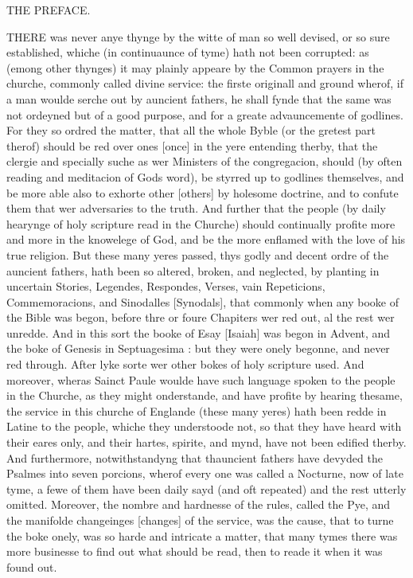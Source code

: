 THE
PREFACE.

THERE
was never anye thynge by the witte of man so well devised, or so sure
established, whiche (in continuaunce of tyme) hath not been corrupted:
as (emong other thynges) it may plainly appeare by the Common prayers
in the churche, commonly called divine service: the firste originall
and ground wherof, if a man woulde serche out by auncient fathers, he
shall fynde that the same was not ordeyned but of a good purpose, and
for a greate advauncemente of godlines. For they so ordred the matter,
that all the whole Byble (or the gretest part therof) should be red
over ones [once]
in the yere entending therby, that the clergie and specially suche as
wer Ministers of the congregacion, should (by often reading and meditacion
of Gods word), be styrred up to godlines themselves, and be more able
also to exhorte other [others]
by holesome doctrine, and to confute them that wer adversaries to the
truth. And further that the people (by daily hearynge of holy scripture
read in the Churche) should continually profite more and more in the
knowelege of God, and be the more enflamed with the love of his true
religion. But these many yeres passed, thys godly and decent ordre of
the auncient fathers, hath been so altered, broken, and neglected, by
planting in uncertain Stories, Legendes, Respondes, Verses, vain Repeticions,
Commemoracions, and Sinodalles [Synodals],
that commonly when any booke of the Bible was begon, before thre or
foure Chapiters wer red out, al the rest wer unredde. And in this sort
the booke of Esay [Isaiah]
was begon in Advent, and the boke of Genesis in Septuagesima : but they
were onely begonne, and never red through. After lyke sorte wer other
bokes of holy scripture used. And moreover, wheras Sainct Paule woulde
have such language spoken to the people in the Churche, as they might
onderstande, and have profite by hearing thesame, the service in this
churche of Englande (these many yeres) hath been redde in Latine to
the people, whiche they understoode not, so that they have heard with
their eares only, and their hartes, spirite, and mynd, have not been
edified therby. And furthermore, notwithstandyng that thauncient fathers
have devyded the Psalmes into seven porcions, wherof every one was called
a Nocturne, now of late tyme, a fewe of them have been daily sayd (and
oft repeated) and the rest utterly omitted. Moreover, the nombre and
hardnesse of the rules, called the Pye, and the manifolde changeinges
[changes]
of the service, was the cause, that to turne the boke onely, was so
harde and intricate a matter, that many tymes there was more businesse
to find out what should be read, then to reade it when it was found
out.

